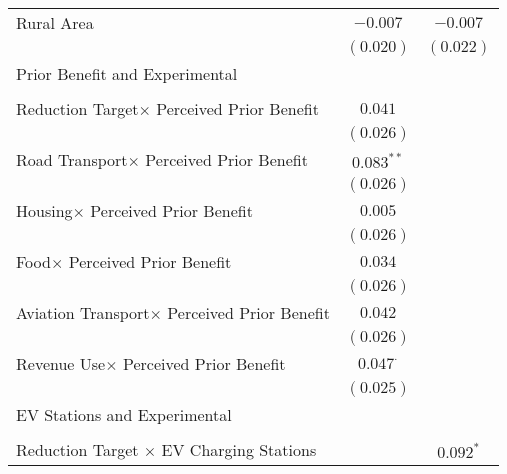 \begin{center}
\begin{tiny}
\begin{longtable}{l@{} c@{} c@{}}
Rural Area                                               & $-0.007$         & $-0.007$         \\
                                                         & $(0.020)$        & $(0.022)$        \\
Prior Benefit and Experimental                           &                  &                  \\
                                                         &                  &                  \\
\quad Reduction Target$\times$ Perceived Prior Benefit   & $0.041$          &                  \\
                                                         & $(0.026)$        &                  \\
\quad Road Transport$\times$ Perceived Prior Benefit     & $0.083^{**}$     &                  \\
                                                         & $(0.026)$        &                  \\
\quad Housing$\times$ Perceived Prior Benefit            & $0.005$          &                  \\
                                                         & $(0.026)$        &                  \\
\quad Food$\times$ Perceived Prior Benefit               & $0.034$          &                  \\
                                                         & $(0.026)$        &                  \\
\quad Aviation Transport$\times$ Perceived Prior Benefit & $0.042$          &                  \\
                                                         & $(0.026)$        &                  \\
\quad Revenue Use$\times$ Perceived Prior Benefit        & $0.047^{\cdot}$  &                  \\
                                                         & $(0.025)$        &                  \\
EV Stations and Experimental                             &                  &                  \\
                                                         &                  &                  \\
\quad Reduction Target $\times$ EV Charging Stations     &                  & $0.092^{*}$      \\

\end{longtable}
\end{tiny}
\end{center}
